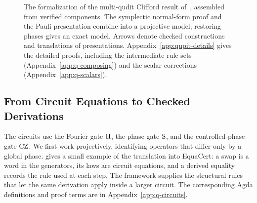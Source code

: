 \documentclass[acmsmall,screen,nonacm]{acmart}
\begin{document}
\begin{figure}[!htbp]
\centering
\unskip
\caption{The formalization of the multi-qudit Clifford result of~\quditcite{}, assembled from verified components. The symplectic normal-form proof and the Pauli presentation combine into a projective model; restoring phases gives an exact model. Arrows denote checked constructions and translations of presentations. Appendix~\ref{app:qupit-details} gives the detailed proofs, including the intermediate rule sets (Appendix~\ref{app:q-composing}) and the scalar corrections (Appendix~\ref{app:q-scalars}).}
\label{fig:q-route}
\end{figure}

\subsection{From Circuit Equations to Checked Derivations}\label{sec:q-circuits}

The circuits use the Fourier gate $\mathrm{H}$, the phase gate $\mathrm{S}$, and the controlled-phase gate $\mathrm{CZ}$. We first work projectively, identifying operators that differ only by a global phase.  gives a small example of the translation into EquaCert: a swap is a word in the generators, its laws are circuit equations, and a derived equality records the rule used at each step. The framework supplies the structural rules that let the same derivation apply inside a larger circuit. The corresponding Agda definitions and proof terms are in Appendix~\ref{app:q-circuits}.
\end{document}
